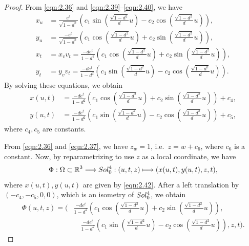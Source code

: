 \documentclass[10pt,a4paper]{amsart}
\begin{document}
\begin{proof}
		From \eqref{eqn:2.36} and \eqref{eqn:2.39}--\eqref{eqn:2.40}, we have
		\begin{equation*}
			\begin{aligned}
				x_u
				&=\frac{e^t}{\sqrt{1-d^2}}
				\left(c_1\sin\left(\tfrac{\sqrt{1-d^2}}{d}u\right)-c_2\cos\left(\tfrac{\sqrt{1-d^2}}{d}u\right)\right),\\
				y_u
				&=\frac{-e^t}{\sqrt{1-d^2}}
				\left(c_1\cos\left(\tfrac{\sqrt{1-d^2}}{d}u\right)+c_2\sin\left(\tfrac{\sqrt{1-d^2}}{d}u\right)\right),\\
				x_t
				&=x_v v_t
				=\frac{-de^t}{1-d^2}
				\left(c_1\cos\left(\tfrac{\sqrt{1-d^2}}{d}u\right)+c_2\sin\left(\tfrac{\sqrt{1-d^2}}{d}u\right)\right),\\
				y_t
				&=y_v v_t
				=\frac{-de^t}{1-d^2}
				\left(c_1\sin\left(\tfrac{\sqrt{1-d^2}}{d}u\right)-c_2\cos\left(\tfrac{\sqrt{1-d^2}}{d}u\right)\right).
			\end{aligned}
		\end{equation*}
		By solving these equations, we obtain
		\begin{equation}\label{eqn:2.42}
			\begin{aligned}
				x(u,t) &= \frac{-de^t}{1-d^2}\left(c_1\cos\left(\tfrac{\sqrt{1-d^2}}{d}u\right)+c_2\sin\left(\tfrac{\sqrt{1-d^2}}{d}u\right)\right)+c_4,\\
				y(u,t) &= \frac{-de^t}{1-d^2}\left(c_1\sin\left(\tfrac{\sqrt{1-d^2}}{d}u\right)-c_2\cos\left(\tfrac{\sqrt{1-d^2}}{d}u\right)\right)+c_5,
			\end{aligned}
		\end{equation}
		where $c_4, c_5$ are constants.
		
		From \eqref{eqn:2.36} and \eqref{eqn:2.37}, we have $z_w=1$, i.e.\ 
		$z=w+c_6$, where $c_6$ is a constant.
		Now, by reparametrizing to use $z$ as a local coordinate, we have
		\begin{equation*}
			\begin{aligned}
				\Phi:\Omega\subset\mathbb{R}^3 \longrightarrow {\rm Sol_0^4}:
				(u,t,z)\longmapsto (x(u,t),y(u,t),z,t),
			\end{aligned}
		\end{equation*}
		where $x(u,t), y(u,t)$ are given by \eqref{eqn:2.42}.
		After a left translation by $(-c_4,-c_5,0,0)$,
		which is an isometry of ${\rm Sol_0^4}$, we obtain
		\begin{equation*}
			\begin{aligned}
				\Phi(u,t,z)
				=\Bigg(&\frac{-de^t}{1-d^2}\left(c_1\cos\left(\tfrac{\sqrt{1-d^2}}{d}u\right)
				+c_2\sin\left(\tfrac{\sqrt{1-d^2}}{d}u\right)\right), \\
				&\quad \frac{-de^t}{1-d^2}\left(c_1\sin\left(\tfrac{\sqrt{1-d^2}}{d}u\right)
				-c_2\cos\left(\tfrac{\sqrt{1-d^2}}{d}u\right)\right)
				,z,t\Bigg).
			\end{aligned}
		\end{equation*}
		

\end{proof}
\end{document}
